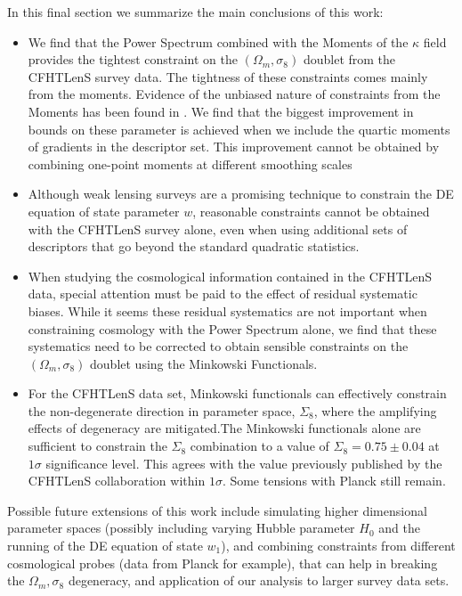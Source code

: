 \documentclass[reprint,aps,prd,superscriptaddress,showkeys,showpacs]{revtex4-1}
\begin{document}
In this final section we summarize the main conclusions of this work:
\begin{itemize}
\item We find that the Power Spectrum combined with the Moments of the $\kappa$ field provides the tightest constraint on the $(\Omega_m,\sigma_8)$ doublet from the CFHTLenS survey data. The tightness of these constraints comes mainly from the moments. Evidence of the unbiased nature of constraints from the Moments has been found in \citep{PetriSpurious}. We find that the biggest improvement in bounds on these parameter is achieved when we include the quartic moments of gradients in the descriptor set. This improvement cannot be obtained by combining one-point moments at different smoothing scales 
\item Although weak lensing surveys are a promising technique to constrain the DE equation of state parameter $w$, reasonable constraints cannot be obtained with the CFHTLenS survey alone, even when using additional sets of descriptors that go beyond the standard quadratic statistics.
\item When studying the cosmological information contained in the CFHTLenS data, special attention must be paid to the effect of residual systematic biases. While it seems these residual systematics are not important when constraining cosmology with the Power Spectrum alone, we find that these systematics need to be corrected to obtain sensible constraints on the $(\Omega_m,\sigma_8)$ doublet using the Minkowski Functionals. 
\item For the CFHTLenS data set, Minkowski functionals can effectively constrain the non-degenerate direction in parameter space, $\Sigma_8$, where the amplifying effects of degeneracy are mitigated.The Minkowski functionals alone are sufficient to constrain the $\Sigma_8$ combination to a value of $\Sigma_8=0.75\pm0.04$ at $1\sigma$ significance level. This agrees with the value previously published by the CFHTLenS collaboration within $1\sigma$. Some tensions with Planck \citep{PlanckXVI2013} still remain.  
\end{itemize}

Possible future extensions of this work include simulating higher dimensional parameter spaces (possibly including varying Hubble parameter $H_0$ and the running of the DE equation of state $w_1$), and combining constraints from different cosmological probes (data from Planck for example), that can help in breaking the $\Omega_m,\sigma_8$ degeneracy, and application of our analysis to larger survey data sets. 
\end{document}
